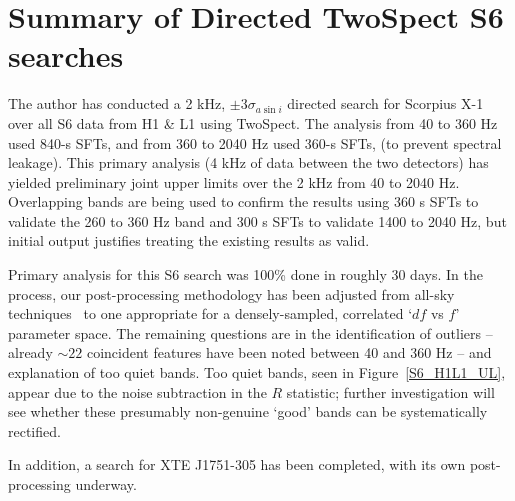 \section{Summary of Directed TwoSpect S6 searches}

The author has conducted a 2 kHz, $\pm 3 \sigma_{a \sin i}$ directed search for Scorpius X-1 over all S6 data from H1 \& L1 using TwoSpect.
The analysis from 40 to 360 Hz used 840-s SFTs,
and from 360 to 2040 Hz used 360-s SFTs,
(to prevent spectral leakage).
This primary analysis (4 kHz of data between the two detectors) has yielded preliminary joint upper limits over the 2 kHz from 40 to 2040 Hz.
Overlapping bands are being used to confirm the results using
360 s SFTs to validate the 260 to 360 Hz band and
300 s SFTs to validate 1400 to 2040 Hz, but initial output justifies treating the existing results as valid. 

Primary analysis for this S6 search was 100\% done in roughly 30 days.
In the process, our post-processing methodology has been adjusted from all-sky techniques~\cite{GoetzTwoSpectResults2014} to one appropriate for a densely-sampled, correlated `$df$ vs $f$' parameter space.
The remaining questions are in the identification of outliers -- already $\sim 22$ coincident features have been noted between 40 and 360 Hz -- and explanation of too quiet bands.
Too quiet bands, seen in Figure~\ref{S6_H1L1_UL}, appear due to the noise subtraction in the $R$ statistic; further investigation will see whether these presumably non-genuine `good' bands can be systematically rectified.

In addition, a search for XTE J1751-305 has been completed, with its own post-processing underway.



